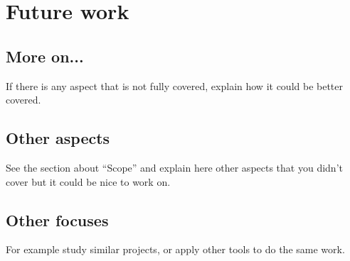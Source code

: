 \documentclass[a4paper, 12pt]{book}
\begin{document}
\section{Future work}
\label{sec:future}

\subsection{More on...}

If there is any aspect that is not fully covered, explain how it could be
better covered.

\subsection{Other aspects}

See the section about ``Scope'' and explain here other aspects that you didn't
cover but it could be nice to work on.


\subsection{Other focuses}

For example study similar projects, or apply other tools to do the same work.

\appendix
\end{document}
